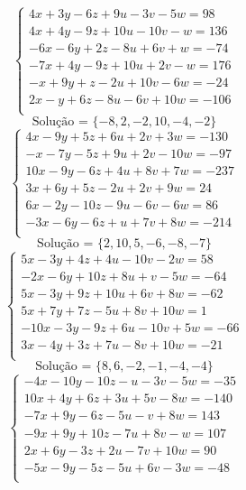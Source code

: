\documentclass[12pt,oneside,a4paper]{article}
\begin{document}
\vspace{\baselineskip}
\begin{equation*}
\begin{cases}
4x+3y-6z+9u-3v-5w=98 \\
4x+4y-9z+10u-10v-w=136 \\
-6x-6y+2z-8u+6v+w=-74 \\
-7x+4y-9z+10u+2v-w=176 \\
-x+9y+z-2u+10v-6w=-24 \\
2x-y+6z-8u-6v+10w=-106 \\
\end{cases}
\end{equation*}
\begin{equation*}
\text{Solução = }\{-8,2,-2,10,-4,-2\}
\end{equation*}
\vspace{\baselineskip}
\begin{equation*}
\begin{cases}
4x-9y+5z+6u+2v+3w=-130 \\
-x-7y-5z+9u+2v-10w=-97 \\
10x-9y-6z+4u+8v+7w=-237 \\
3x+6y+5z-2u+2v+9w=24 \\
6x-2y-10z-9u-6v-6w=86 \\
-3x-6y-6z+u+7v+8w=-214 \\
\end{cases}
\end{equation*}
\begin{equation*}
\text{Solução = }\{2,10,5,-6,-8,-7\}
\end{equation*}
\vspace{\baselineskip}
\begin{equation*}
\begin{cases}
5x-3y+4z+4u-10v-2w=58 \\
-2x-6y+10z+8u+v-5w=-64 \\
5x-3y+9z+10u+6v+8w=-62 \\
5x+7y+7z-5u+8v+10w=1 \\
-10x-3y-9z+6u-10v+5w=-66 \\
3x-4y+3z+7u-8v+10w=-21 \\
\end{cases}
\end{equation*}
\begin{equation*}
\text{Solução = }\{8,6,-2,-1,-4,-4\}
\end{equation*}
\vspace{\baselineskip}
\begin{equation*}
\begin{cases}
-4x-10y-10z-u-3v-5w=-35 \\
10x+4y+6z+3u+5v-8w=-140 \\
-7x+9y-6z-5u-v+8w=143 \\
-9x+9y+10z-7u+8v-w=107 \\
2x+6y-3z+2u-7v+10w=90 \\
-5x-9y-5z-5u+6v-3w=-48 \\
\end{cases}
\end{equation*}
\end{document}
